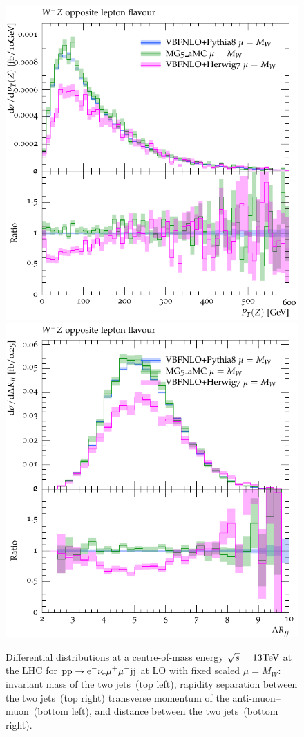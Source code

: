 \begin{figure}[htbp]
\begin{center}
   \includegraphics[scale=0.65]{figs/VBFNLO_WmZ_OF_ZPt}
   \includegraphics[scale=0.65]{figs/VBFNLO_WmZ_OF_dRjj}
\caption{Differential distributions at a centre-of-mass energy $\sqrt{s}=13{\rm TeV}$ at the LHC for ${\rm p} {\rm p}
  \to {\rm e}^-  \nu_{\rm e}  \mu^+ \mu^- {\rm j} {\rm j}$ at LO with fixed scaled $\mu = M_W$: 
                invariant mass of the two jets~(top left),
                rapidity separation between the two jets~(top right)
                transverse momentum of the anti-muon--muon~(bottom left), and
                distance between the two jets~(bottom right).}
\label{vbs_fig_shower_1a}
\end{center}
\end{figure}


